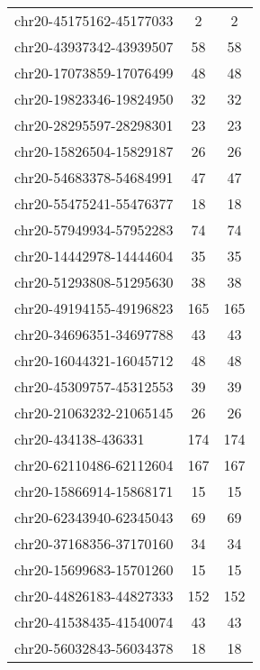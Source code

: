 \begin{longtable}{lSS}
	chr20-45175162-45177033 & 2      & 2                           \\
	chr20-43937342-43939507 & 58     & 58                          \\
	chr20-17073859-17076499 & 48     & 48                          \\
	chr20-19823346-19824950 & 32     & 32                          \\
	chr20-28295597-28298301 & 23     & 23                          \\
	chr20-15826504-15829187 & 26     & 26                          \\
	chr20-54683378-54684991 & 47     & 47                          \\
	chr20-55475241-55476377 & 18     & 18                          \\
	chr20-57949934-57952283 & 74     & 74                          \\
	chr20-14442978-14444604 & 35     & 35                          \\
	chr20-51293808-51295630 & 38     & 38                          \\
	chr20-49194155-49196823 & 165    & 165                         \\
	chr20-34696351-34697788 & 43     & 43                          \\
	chr20-16044321-16045712 & 48     & 48                          \\
	chr20-45309757-45312553 & 39     & 39                          \\
	chr20-21063232-21065145 & 26     & 26                          \\
	chr20-434138-436331     & 174    & 174                         \\
	chr20-62110486-62112604 & 167    & 167                         \\
	chr20-15866914-15868171 & 15     & 15                          \\
	chr20-62343940-62345043 & 69     & 69                          \\
	chr20-37168356-37170160 & 34     & 34                          \\
	chr20-15699683-15701260 & 15     & 15                          \\
	chr20-44826183-44827333 & 152    & 152                         \\
	chr20-41538435-41540074 & 43     & 43                          \\
	chr20-56032843-56034378 & 18     & 18                          \\

\end{longtable}
